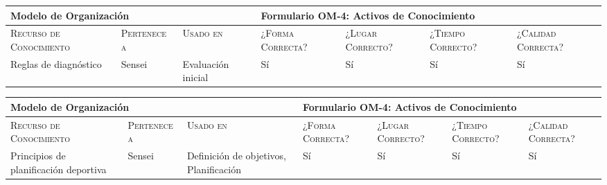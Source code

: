 \documentclass[12pt,a4paper,twoside,spanish]{article}      %
\begin{document}
            \begin{table}[H]
                \scriptsize
                \begin{tabularx}{\textwidth}{|p{1.3cm}|p{1.3cm}|p{1.3cm}|X|X|X|X|} \hline         
                    \multicolumn{3}{|l}{\textbf{Modelo de Organización}} & 
                    \multicolumn{4}{|l|}{\textbf{Formulario OM-4: Activos de Conocimiento}} \\ \hline\hline
                    
                    \textsc{Recurso de Conocimiento} & \textsc{Pertenece a} &  \textsc{Usado en} &  \textsc{¿Forma Correcta?} & \textsc{¿Lugar Correcto?} & \textsc{¿Tiempo Correcto?} & \textsc{¿Calidad Correcta?} \\ \hline
                    
                    Reglas de diagnóstico & Sensei & Evaluación inicial & Sí & Sí & Sí & Sí \\ \hline
                    
                \end{tabularx}
                \label{tab.OM4-reglas}
            \end{table}

            \begin{table}[H]
                \scriptsize
                \begin{tabularx}{\textwidth}{|p{1.3cm}|p{1.3cm}|p{1.3cm}|X|X|X|X|} \hline   
                    \multicolumn{3}{|l}{\textbf{Modelo de Organización}} & 
                    \multicolumn{4}{|l|}{\textbf{Formulario OM-4: Activos de Conocimiento}} \\ \hline\hline
                    
                    \textsc{Recurso de Conocimiento} & \textsc{Pertenece a} &  \textsc{Usado en} &  \textsc{¿Forma Correcta?} & \textsc{¿Lugar Correcto?} & \textsc{¿Tiempo Correcto?} & \textsc{¿Calidad Correcta?} \\ \hline
                    
                    Principios de planificación deportiva & Sensei & Definición de objetivos, Planificación & Sí & Sí & Sí & Sí \\ \hline
                    
                \end{tabularx}
                \label{tab.OM4-principios}
            \end{table}
\end{document}
